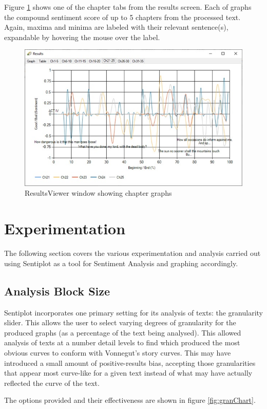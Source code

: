 \documentclass{article}
\begin{document}
        Figure \ref{fig:resultschapters} shows one of the chapter tabs from the results screen. Each of graphs the compound sentiment score of up to 5 chapters from the processed text. Again, maxima and minima are labeled with their relevant sentence(s), expandable by hovering the mouse over the label.
        \begin{figure}[H]
            \includegraphics[width=1\textwidth]{Misc/resultschapters}
            \caption{ResultsViewer window showing chapter graphs}
            \label{fig:resultschapters}
        \end{figure}
\newpage
\section{Experimentation}
The following section covers the various experimentation and analysis carried out using Sentiplot as a tool for Sentiment Analysis and graphing accordingly.
    \subsection{Analysis Block Size}
        Sentiplot incorporates one primary setting for its analysis of texts: the granularity slider. This allows the user to select varying degrees of granularity for the produced graphs (as a percentage of the text being analysed). This allowed analysis of texts at a number detail levels to find which produced the most obvious curves to conform with Vonnegut's story curves. This may have introduced a small amount of positive-results bias, accepting those granularities that appear most curve-like for a given text instead of what may have actually reflected the curve of the text.

        The options provided and their effectiveness are shown in figure \ref{fig:granChart}.
        
\end{document}
